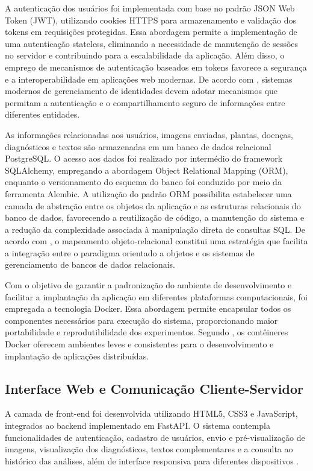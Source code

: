 \documentclass[portuguese]{sbc2025}%
\begin{document}
A autenticação dos usuários foi implementada com base no padrão JSON Web Token (JWT), utilizando cookies HTTPS para armazenamento e 
validação dos tokens em requisições protegidas. Essa abordagem permite a implementação de uma autenticação stateless, eliminando a 
necessidade de manutenção de sessões no servidor e contribuindo para a escalabilidade da aplicação. Além disso, o emprego de mecanismos 
de autenticação baseados em tokens favorece a segurança e a interoperabilidade em aplicações web modernas. De acordo com 
\citep{ref10}, sistemas modernos de gerenciamento de identidades devem adotar mecanismos que permitam a autenticação e o 
compartilhamento seguro de informações entre diferentes entidades.

As informações relacionadas aos usuários, imagens enviadas, plantas, doenças, diagnósticos e textos são armazenadas em um banco de 
dados relacional PostgreSQL. O acesso aos dados foi realizado por intermédio do framework SQLAlchemy, empregando a abordagem Object
Relational Mapping (ORM), enquanto o versionamento do esquema do banco foi conduzido por meio da ferramenta Alembic. A utilização 
do padrão ORM possibilita estabelecer uma camada de abstração entre os objetos da aplicação e as estruturas relacionais do banco 
de dados, favorecendo a reutilização de código, a manutenção do sistema e a redução da complexidade associada à manipulação direta
de consultas SQL. De acordo com \citep{ref11}, o mapeamento objeto-relacional constitui uma estratégia que facilita a integração 
entre o paradigma orientado a objetos e os sistemas de gerenciamento de bancos de dados relacionais.

Com o objetivo de garantir a padronização do ambiente de desenvolvimento e facilitar a implantação da aplicação em diferentes 
plataformas computacionais, foi empregada a tecnologia Docker. Essa abordagem permite encapsular todos os componentes necessários 
para execução do sistema, proporcionando maior portabilidade e reprodutibilidade dos experimentos. Segundo \citep{ref12}, os 
contêineres Docker oferecem ambientes leves e consistentes para o desenvolvimento e implantação de aplicações distribuídas.

\subsection{Interface Web e Comunicação Cliente-Servidor}

A camada de front-end foi desenvolvida utilizando HTML5, CSS3 e JavaScript, integrados ao backend implementado em FastAPI. O sistema 
contempla funcionalidades de autenticação, cadastro de usuários, envio e pré-visualização de imagens, visualização dos diagnósticos, 
textos complementares e a consulta ao histórico das análises, além de interface responsiva para diferentes dispositivos \citep{ref13}.
\end{document}

